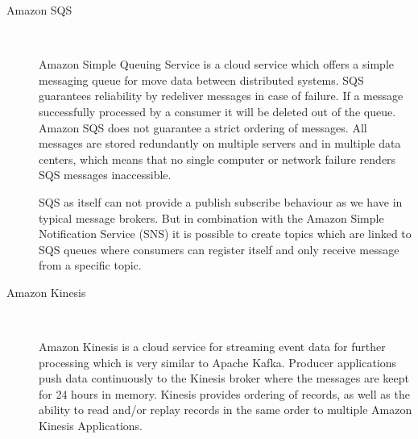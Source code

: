 \begin{description}
    \item [Amazon SQS] \hfill \\
    {
        Amazon Simple Queuing Service is a cloud service which offers a simple messaging queue for
        move data between distributed systems. SQS guarantees reliability
        by redeliver messages in case of failure. If a message successfully
        processed by a consumer it will be deleted out of the queue.  Amazon SQS
        does not guarantee a strict ordering of messages. All messages are
        stored redundantly on multiple servers and in multiple data centers,
        which means that no single computer or network failure
        renders SQS messages inaccessible.\cite{amazonSQS} \cite{amazonSQSFaq} 

        SQS as itself can not provide a publish subscribe behaviour as we
        have in typical message brokers. But in combination with the Amazon
        Simple  Notification Service (SNS) it
        is possible to create topics which are linked to SQS queues where
        consumers can register itself and only receive message from a specific
        topic. \cite{amazonSqsPubSub}
     }
    \item [Amazon Kinesis] \hfill \\
    { 
    Amazon Kinesis is a cloud service for streaming event
    data for further processing which is very similar to Apache Kafka. Producer
    applications push data continuously to the Kinesis broker where the messages
    are keept for 24 hours in memory. Kinesis provides ordering of records, as
    well as the ability to read and/or replay records in the same order to
    multiple Amazon Kinesis Applications.
    \cite{amazonKinesis} \cite{amazonKinesisFAQ} 
    
}
\end{description}
